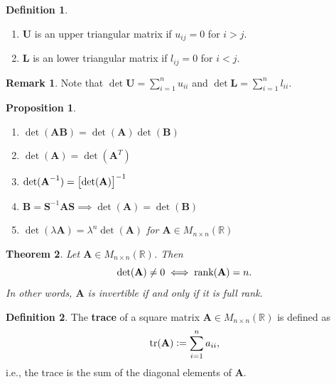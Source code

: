 \documentclass[12pt,openany]{book}
\newtheorem{theorem}{Theorem}[chapter]
\newtheorem{proposition}[theorem]{Proposition}
\theoremstyle{definition}
\newtheorem{definition}{Definition}[chapter]
\newtheorem{remark}{Remark}[chapter]
\newcommand{\R}{\mathbb{R}}
\newcommand{\ie}{\textnormal{i.e.}}
\newcommand{\by}{\times}
\newcommand{\rank}{\textnormal{rank}}
\newcommand{\tr}{\textnormal{tr}}
\begin{document}
	\vspace{4pt}
	\begin{tcolorbox}[colframe=defcolor,title={\color{white}\bf Upper and Lower Triangluar Matrix}]
		\begin{definition}
			\ \begin{enumerate}[(1)]
				\item \textbf{U} is an upper triangular matrix if \(u_{ij}=0\) for \(i>j\).
				\item \textbf{L} is an lower triangular matrix if \(l_{ij}=0\) for \(i<j\).
			\end{enumerate}	
		\end{definition}
	\end{tcolorbox}
	\begin{remark}
		Note that \(\det\textbf{U}=\sum_{i=1}^n u_{ii}\) and \(\det\textbf{L}=\sum_{i=1}^nl_{ii}\).
	\end{remark}
	\newpage
	\begin{tcolorbox}[colframe=procolor,title={\color{white}\bf }]
		\begin{proposition}
			\ \begin{enumerate}[(1)]
				\item \(\det(\textbf{A}\textbf{B})=\det(\textbf{A})\det(\textbf{B})\)
				\item \(\det(\textbf{A})=\det(\textbf{A}^T)\)
				\item \(\det(\textbf{A}^{-1})=\sbr{\det(\textbf{A})}^{-1}\)
				\item \(\textbf{B}=\textbf{S}^{-1}\textbf{A}\textbf{S}\implies\det(\textbf{A})=\det(\textbf{B})\)
				\item \(\det(\lambda\textbf{A})=\lambda^n\det(\textbf{A})\) for \(\textbf{A}\in M_{n\by n}(\R)\)
			\end{enumerate}
		\end{proposition}
	\end{tcolorbox}
	\vspace{8pt}
	\begin{tcolorbox}[colframe=thmcolor,title={\color{white}\bf }]
		\begin{theorem}
			Let \(\textbf{A}\in M_{n\by n}(\R)\). Then \[
			\det(\textbf{A})\neq 0\iff\rank(\textbf{A})=n.
			\] In other words, \(\textbf{A}\) is invertible if and only if it is full rank.
		\end{theorem}
	\end{tcolorbox}
	\vspace{8pt}
	\begin{tcolorbox}[colframe=defcolor,title={\color{white}\bf Trace}]
		\begin{definition}
			The \textbf{trace} of a square matrix \(\textbf{A}\in M_{n\by n}(\R)\) is defined as \[
			\tr(\textbf{A}):=\sum_{i=1}^na_{ii},
			\] \ie, the trace is the sum of the diagonal elements of \(\textbf{A}\).
		\end{definition}
	\end{tcolorbox}
\end{document}

